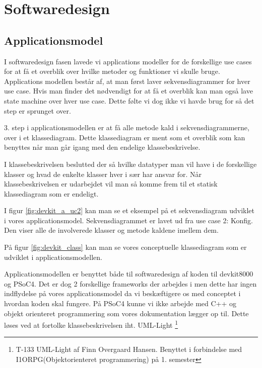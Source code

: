 \section{Softwaredesign}

\subsection{Applicationsmodel}
I softwaredesign fasen lavede vi applications modeller for de forskellige use cases for at få et overblik over hvilke metoder og funktioner vi skulle bruge. Applications modellen består af, at man først laver sekvensdiagrammer for hver use case. Hvis man finder det nødvendigt for at få et overblik kan man også lave state machine over hver use case. Dette følte vi dog ikke vi havde brug for så det step er sprunget over.

3. step i applicationsmodellen er at få alle metode kald i sekvensdiagrammerne, over i et klassediagram. Dette klassediagram er ment som et overblik som kan benyttes når man går igang med den endelige klassebeskrivelse.

I klassebeskrivelsen beslutted der så hvilke datatyper man vil have i de forskellige klasser og hvad de enkelte klasser hver i sær har ansvar for. Når klassebeskrivelsen er udarbejdet vil man så komme frem til et statisk klassediagram som er endeligt.


I figur \ref{fig:devkit_a_uc2} kan man se et eksempel på et sekvensdiagram udviklet i vores applicationsmodel. Sekvensdiagrammet er lavet ud fra use case 2: Konfig. Den viser alle de involverede klasser og metode kaldene imellem dem.

På figur \ref{fig:devkit_class} kan man se vores conceptuelle klassediagram som er udviklet i applicationsmodellen.


Applicationsmodellen er benyttet både til softwaredesign af koden til devkit8000 og PSoC4. Det er dog 2 forskellige frameworks der arbejdes i men dette har ingen indflydelse på vores applicationsmodel da vi beskæftigere os med conceptet i hvordan koden skal fungere. På PSoC4 kunne vi ikke arbejde med C++ og objekt orienteret programmering som vores dokumentation lægger op til. Dette løses ved at fortolke klassebeskrivelsen iht. UML-Light \footnote{T-133 UML-Light af Finn Overgaard Hansen. Benyttet i forbindelse med I1ORPG(Objektorienteret programmering) på 1. semester}

